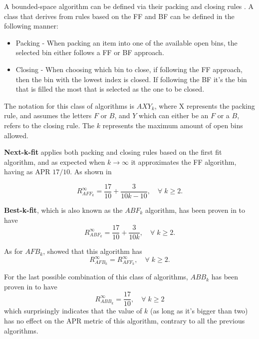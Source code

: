 A bounded-space algorithm can be defined via their packing and closing rules
\cite{coffman2013bin}. A class that derives from rules based on the FF and BF
can be defined in the following manner: 
\begin{itemize}
    \item Packing - When packing an item into one of the available open bins,
        the selected bin either follows a FF or BF approach.
    \item Closing - When choosing which bin to close, if following the FF
        approach, then the bin with the lowest index is closed. If following the
        BF it's the bin that is filled the most that is selected as the one to
        be closed.
\end{itemize}

The notation for this class of algorithms is $AXY_k$, where X represents the
packing rule, and assumes the letters $F$ or $B$, and $Y$ which can either be an
$F$ or a $B$, refers to the closing rule. The $k$ represents the maximum amount
of open bins allowed.

\textbf{Next-k-fit} applies both packing and closing rules based on the first
fit algorithm, and as expected when $k \to \infty$ it approximates the FF
algorithm, having as APR $17/10$. As shown in \cite{mao1993tight}

\begin{equation}
    R_{AFF_k}^\infty = \frac{17}{10} + \frac{3}{10k - 10}, \quad \forall \; k \geq 2.
\end{equation}

\textbf{Best-k-fit}, which is also known as the $ABF_k$ algorithm, has been
proven in \cite{mao1993besk} to have
\begin{equation}
    R_{ABF_k}^\infty = \frac{17}{10} + \frac{3}{10k}, \quad  \forall \; k \geq 2.
\end{equation}

As for $AFB_k$, \cite{zhang1994tight} showed that this algorithm has
\begin{equation}
    R_{AFB_k}^\infty = R_{AFF_k}^\infty, \quad  \forall \; k \geq 2.
\end{equation}

For the last possible combination of this class of algorithms, $ABB_k$ has been
proven in \cite{csirik2001bounded} to have 
\begin{equation}
    R_{ABB_k}^\infty = \frac{17}{10},  \quad \forall \; k \geq 2
\end{equation}
which surprisingly indicates that the value of $k$ (as long as it's bigger than
two) has no effect on the APR metric of this algorithm, contrary to all the
previous algorithms.

